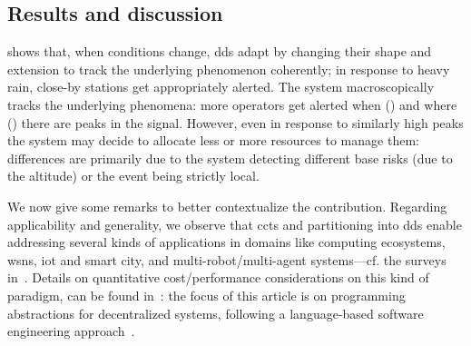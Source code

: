 \subsection{Results and discussion}\label{s:result-and-discussion}

 shows
that, when conditions change, \acp{dd} adapt by
changing their shape and extension to track the underlying phenomenon coherently;
in response to heavy rain,
close-by stations get appropriately alerted.
%
The system macroscopically tracks the underlying phenomena:
more operators get alerted when ()
and where ()
there are peaks in the signal.
%
However, even in response to similarly high peaks
the system may decide to allocate less or more resources to manage them:
differences are primarily due to the system detecting different base risks
(due to the altitude)
or the event being strictly local.

We now give some remarks to better contextualize the contribution.
%
Regarding applicability and generality,
 we observe that \acp{cct} and partitioning into \acp{dd}
 enable addressing several kinds of applications 
 in domains like 
 computing ecosystems,
 \acp{wsn},
 \ac{iot} and smart city,
 and multi-robot/multi-agent systems---cf. the surveys in~\cite{DBLP:journals/fgcs/PianiniCVN21,DBLP:journals/jlap/ViroliBDACP19}.
%
Details on quantitative cost/performance considerations on this kind of paradigm,
 can be found in~\cite{DBLP:journals/fgcs/PianiniCVN21,DBLP:journals/eaai/CasadeiVAPD21}: 
the focus of this article is on programming abstractions for decentralized systems,
 following a language-based software engineering approach~\cite{DBLP:journals/scp/Gupta15}.
%
%

